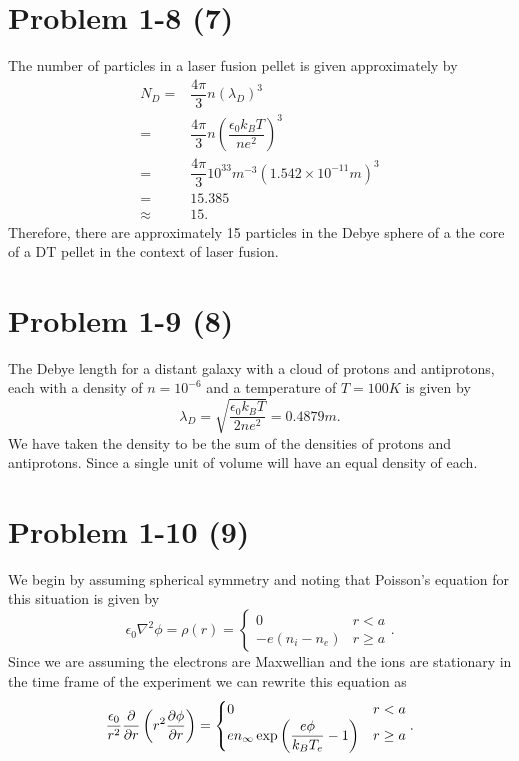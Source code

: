 \section*{Problem 1-8 (7)}
\label{sec:1-8}
The number of particles in a laser fusion pellet is given approximately by
\begin{align}
	N_D =& \dfrac{4\pi}{3}n \left(\lambda_D\right)^{3}\\
	=& \dfrac{4\pi}{3}n \left(\dfrac{\epsilon_0k_BT}{ne^2}\right)^{3}\\
	=& \dfrac{4\pi}{3} 10^{33}m^{-3} \left(1.542\times 10^{-11}m\right)^3\\
	=& 15.385 \\
	\approx& 15.
\end{align}
Therefore, there are approximately 15 particles in the Debye sphere of a the core of a DT pellet in the context of laser fusion.

\section*{Problem 1-9 (8)}
\label{sec:1-9}
The Debye length for a distant galaxy with a cloud of protons and antiprotons, each with a density of \(n = 10^{-6}\) and a temperature of \(T=100K\) is given by
\begin{equation}
	\lambda_D = \sqrt{\dfrac{\epsilon_0k_BT}{2ne^2}} = 0.4879m.
\end{equation}
We have taken the density to be the sum of the densities of protons and antiprotons. Since a single unit of volume will have an equal density of each.

\section*{Problem 1-10 (9)}
\label{sec:1-10}
We begin by assuming spherical symmetry and noting that Poisson's equation for this situation is given by
\begin{equation}
	\epsilon_0 \nabla^2 \phi = \rho(r) = \begin{cases} 
	0 & r < a \\
	-e\left(n_i-n_e\right) & r \geq a
	\end{cases}.
\end{equation}
Since we are assuming the electrons are Maxwellian and the ions are stationary in the time frame of the experiment we can rewrite this equation as
\begin{equation}
	\dfrac{\epsilon_0}{r^2} \dfrac{\partial}{\partial r} \left(r^2\frac{\partial \phi}{\partial r}\right)  = \begin{cases} 
	0 & r < a \\
	en_\infty\exp{\left(\dfrac{e\phi}{k_BT_e}-1\right)} & r \geq a
	\end{cases}.
\end{equation}

